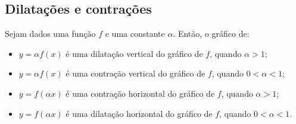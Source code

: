 \subsection{Dilatações e contrações}

Sejam dados uma função $f$ e uma constante $\alpha$. Então, o gráfico de:
\begin{itemize}
\item $y = \alpha f(x)$ é uma dilatação vertical do gráfico de $f$, quando $\alpha > 1$;
\item $y = \alpha f(x)$ é uma contração vertical do gráfico de $f$, quando $0<\alpha < 1$;
\item $y = f(\alpha x)$ é uma contração horizontal do gráfico de $f$, quando $\alpha > 1$;
\item $y = f(\alpha x)$ é uma dilatação horizontal do gráfico de $f$, quando $0<\alpha < 1$.
\end{itemize}


